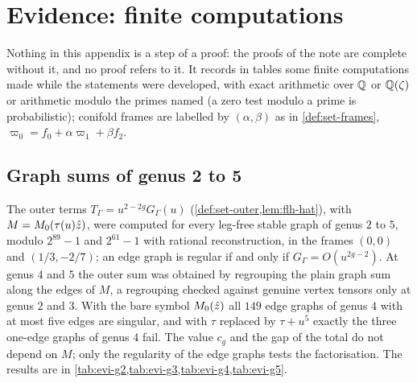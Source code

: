 \section{Evidence: finite computations}
\label{sec:evi}

Nothing in this appendix is a step of a proof: the proofs of the note are complete without it, and no proof refers to it. It records in tables some finite computations made while the statements were developed, with exact arithmetic over $\mathbb{Q}$ or $\mathbb{Q}(\zeta)$ or arithmetic modulo the primes named (a zero test modulo a prime is probabilistic); conifold frames are labelled by $(\alpha,\beta)$ as in \cref{def:set-frames}, $\varpi_0=f_0+\alpha\varpi_1+\beta f_2$.

\subsection{Graph sums of genus 2 to 5}
\label{sec:evi-graphs}

The outer terms $T_\Gamma=u^{2-2g}G_\Gamma(u)$ (\cref{def:set-outer,lem:flh-hat}), with $M=M_{0}(\tau(u)\hat{z})$, were computed for every leg-free stable graph of genus $2$ to $5$, modulo $2^{89}-1$ and $2^{61}-1$ with rational reconstruction, in the frames $(0,0)$ and $(1/3,-2/7)$; an edge graph is regular if and only if $G_\Gamma=O(u^{2g-2})$. At genus $4$ and $5$ the outer sum was obtained by regrouping the plain graph sum along the edges of $M$, a regrouping checked against genuine vertex tensors only at genus $2$ and $3$. With the bare symbol $M_{0}(\hat{z})$ all $149$ edge graphs of genus $4$ with at most five edges are singular, and with $\tau$ replaced by $\tau+u^5$ exactly the three one-edge graphs of genus $4$ fail. The value $c_g$ and the gap of the total do not depend on $M$; only the regularity of the edge graphs tests the factorisation. The results are in \cref{tab:evi-g2,tab:evi-g3,tab:evi-g4,tab:evi-g5}.

